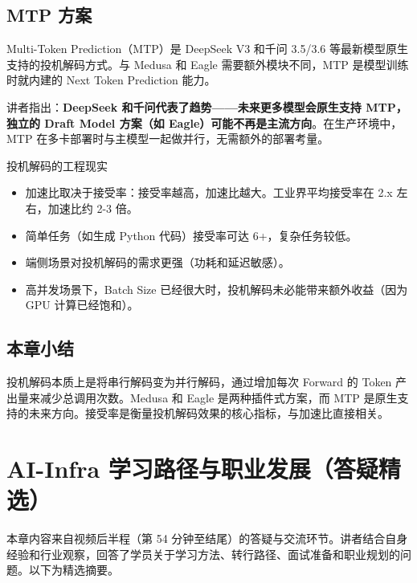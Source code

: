 \documentclass[a4paper]{article}
\begin{document}
\subsection{MTP 方案}

Multi-Token Prediction（MTP）是 DeepSeek V3 和千问 3.5/3.6 等最新模型原生支持的投机解码方式。与 Medusa 和 Eagle 需要额外模块不同，MTP 是模型训练时就内建的 Next Token Prediction 能力。

讲者指出：\textbf{DeepSeek 和千问代表了趋势——未来更多模型会原生支持 MTP，独立的 Draft Model 方案（如 Eagle）可能不再是主流方向}。在生产环境中，MTP 在多卡部署时与主模型一起做并行，无需额外的部署考量。

\begin{importantbox}{投机解码的工程现实}
    \begin{itemize}
        \item 加速比取决于接受率：接受率越高，加速比越大。工业界平均接受率在 2.x 左右，加速比约 2-3 倍。
        \item 简单任务（如生成 Python 代码）接受率可达 6+，复杂任务较低。
        \item 端侧场景对投机解码的需求更强（功耗和延迟敏感）。
        \item 高并发场景下，Batch Size 已经很大时，投机解码未必能带来额外收益（因为 GPU 计算已经饱和）。
    \end{itemize}
\end{importantbox}

\subsection{本章小结}

投机解码本质上是将串行解码变为并行解码，通过增加每次 Forward 的 Token 产出量来减少总调用次数。Medusa 和 Eagle 是两种插件式方案，而 MTP 是原生支持的未来方向。接受率是衡量投机解码效果的核心指标，与加速比直接相关。


\section{AI-Infra 学习路径与职业发展（答疑精选）}

本章内容来自视频后半程（第 54 分钟至结尾）的答疑与交流环节。讲者结合自身经验和行业观察，回答了学员关于学习方法、转行路径、面试准备和职业规划的问题。以下为精选摘要。
\end{document}
